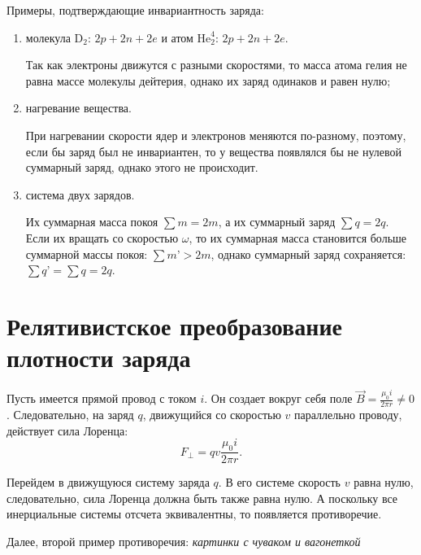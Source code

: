	Примеры, подтверждающие инвариантность заряда:
	\begin{enumerate}
        \item молекула \( \mathrm{D}_2 \): \( 2p + 2n + 2e \) и атом
            \( \mathrm{He}_2^4 \): \( 2p + 2n + 2e \).
            
            Так как электроны движутся с разными скоростями, то масса атома
            гелия не равна массе молекулы дейтерия, однако их заряд одинаков и
            равен нулю;
            
        \item нагревание вещества.
            
            При нагревании скорости ядер и электронов меняются по-разному,
            поэтому, если бы заряд был не инвариантен, то у вещества появлялся
            бы не нулевой суммарный заряд, однако этого не происходит.
        
        \item система двух зарядов.
        
            Их суммарная масса покоя \( \sum m = 2m \), а их суммарный заряд
            \( \sum q = 2q \). Если их вращать со скоростью \( \omega \), то их
            суммарная масса становится больше суммарной массы покоя:
            \( \sum m’ > 2m \), однако суммарный заряд сохраняется:
            \( \sum q’ = \sum q = 2q \).
	\end{enumerate}

\section{Релятивистское преобразование плотности заряда}

	Пусть имеется прямой провод с током \( i \). Он создает вокруг себя поле
    \( \vec{B} = \frac{\mu_0i}{2\pi r} \ne 0 \). Следовательно, на заряд
    \( q \), движущийся со скоростью \( v \) параллельно проводу, действует сила
    Лоренца:
	\begin{equation}
		F_\perp = qv\frac{\mu_0i}{2\pi r}.
        \label{eq24:2}
	\end{equation}
	
	Перейдем в движущуюся систему заряда \( q \). В его системе скорость \( v \)
    равна нулю, следовательно, сила Лоренца должна быть также равна нулю. А
    поскольку все инерциальные системы отсчета эквивалентны, то появляется
    противоречие.
	
	Далее, второй пример противоречия: \textit{картинки с чуваком и вагонеткой}
	
